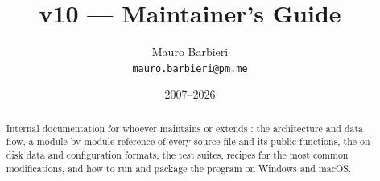 \documentclass[11pt, a4paper]{article}
\title{\spetc{} v10 --- Maintainer's Guide}
\author{Mauro Barbieri\\\small\texttt{mauro.barbieri@pm.me}}
\date{2007--2026}
\begin{document}
\maketitle

\begin{abstract}
Internal documentation for whoever maintains or extends \spetc{}: the
architecture and data flow, a module-by-module reference of every source
file and its public functions, the on-disk data and configuration formats,
the test suites, recipes for the most common modifications, and how to run
and package the program on Windows and macOS.
\end{abstract}

\tableofcontents








\end{document}
